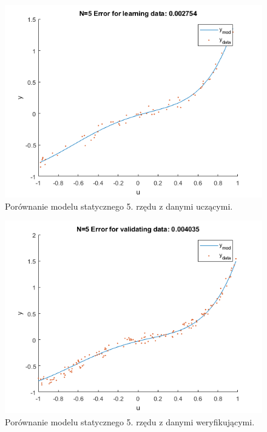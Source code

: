 \begin{figure}[H]
\centering
\includegraphics[width=15cm]{images/s9.png}
\caption{Porównanie modelu statycznego 5. rzędu z danymi uczącymi.}
\label{fig:s9}
\end{figure}
\begin{figure}[H]
\centering
\includegraphics[width=15cm]{images/s10.png}
\caption{Porównanie modelu statycznego 5. rzędu z danymi weryfikującymi.}
\label{fig:s10}
\end{figure}

